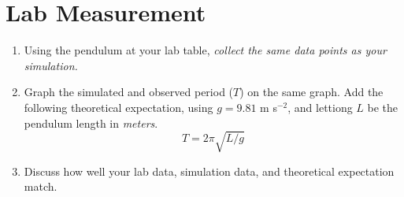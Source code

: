 \documentclass{article}
\begin{document}
\section{Lab Measurement}

\begin{enumerate}
\item Using the pendulum at your lab table, \textit{collect the same data points as your simulation.}
\item Graph the simulated and observed period ($T$) on the same graph.  Add the following theoretical expectation, using $g = 9.81$ m s$^{-2}$, and lettiong $L$ be the pendulum length in \textit{meters}.
\begin{equation}
T = 2\pi \sqrt{L/g}
\end{equation}
\item Discuss how well your lab data, simulation data, and theoretical expectation match.
\end{enumerate}
\end{document}
